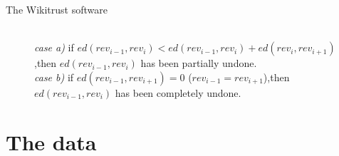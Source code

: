 \documentclass[t]{beamer}
\begin{document}
  \begin{frame}[fragile]{The Wikitrust software}
    \begin{figure}
      \\ 
      \vspace{5mm}
      \textit{case a)} if $ed(rev_{i-1},rev_i) < ed(rev_{i-1},rev_i) +
      ed(rev_{i},rev_{i+1})$,\newline then $ed(rev_{i-1},rev_i)$ has been
      partially undone.\\
      \vspace{5mm}
      \textit{case b)} if $ed(rev_{i-1},rev_{i+1}) = 0$
      ($rev_{i-1} = rev_{i+1}$),\newline then $ed(rev_{i-1},rev_i)$ has been
      completely undone.\cite{Adler2007}
    \end{figure}
\end{frame}

  \section{The data}
\end{document}
